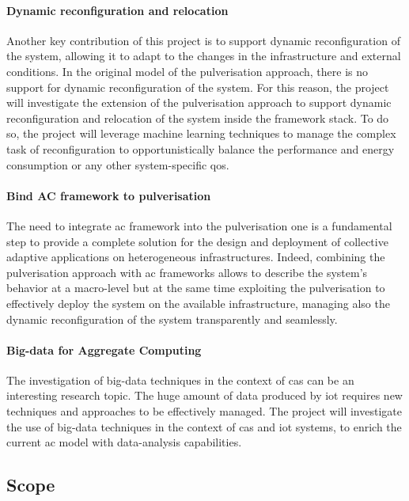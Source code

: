 \documentclass[12pt]{article}
\begin{document}
\paragraph{Dynamic reconfiguration and relocation}
Another key contribution of this project is to support dynamic reconfiguration of the system,
allowing it to adapt to the changes in the infrastructure and external conditions.
%
In the original model of the pulverisation approach,
there is no support for dynamic reconfiguration of the system.
%
For this reason,
the project will investigate the extension of the pulverisation approach
to support dynamic reconfiguration and relocation of the system inside the framework stack.
%
To do so,
the project will leverage machine learning techniques to manage the complex task of reconfiguration
to opportunistically balance the performance and energy consumption or any other system-specific \ac{qos}.

\paragraph{Bind AC framework to pulverisation}
The need to integrate \ac{ac} framework into the pulverisation one is
a fundamental step to provide a complete solution for the design and deployment of
collective adaptive applications on heterogeneous infrastructures.
%
Indeed, combining the pulverisation approach with \ac{ac} frameworks
allows to describe the system's behavior at a macro-level
but at the same time exploiting the pulverisation to
effectively deploy the system on the available infrastructure,
managing also the dynamic reconfiguration of the system transparently and seamlessly.

\paragraph{Big-data for Aggregate Computing}
The investigation of big-data techniques in the context of \ac{cas} can be an interesting research topic.
%
The huge amount of data produced by \ac{iot} requires new techniques and approaches to be effectively managed.
%
The project will investigate the use of big-data techniques in the context of \ac{cas} and \ac{iot} systems,
to enrich the current \ac{ac} model with data-analysis capabilities. 


\subsection{Scope}\label{subsec:scope}
\end{document}
